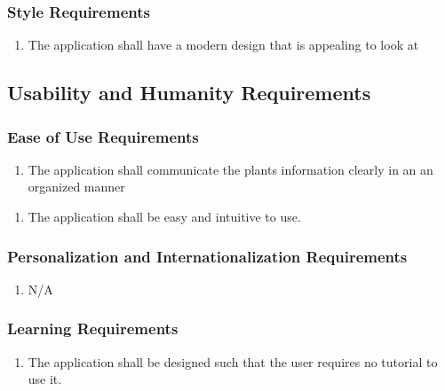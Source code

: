 \documentclass[]{article}
\begin{document}
\subsubsection{Style Requirements}
\label{ssub:style_requirements}
\begin{enumerate}[{LF}4. ]
	\item The application shall have a modern design that is appealing to look at
\end{enumerate}


\subsection{Usability and Humanity Requirements}
\label{sub:usability_and_humanity_requirements}

\subsubsection{Ease of Use Requirements}
\label{ssub:ease_of_use_requirements}
\begin{enumerate}[{UH}1. ]
	\item The application shall communicate the plants information clearly in an an organized manner
\end{enumerate}
\begin{enumerate}[{UH}2. ]
	\item The application shall be easy and intuitive to use.
\end{enumerate}

\subsubsection{Personalization and Internationalization Requirements}
\label{ssub:personalization_and_internationalization_requirements}
\begin{enumerate}[{UH}4. ]
	\item {\color{red}N/A}
\end{enumerate}

\subsubsection{Learning Requirements}
\label{ssub:learning_requirements}
\begin{enumerate}[{UH}5. ]
	\item The application shall be designed such that the user requires no tutorial to use it.
\end{enumerate}
\end{document}
